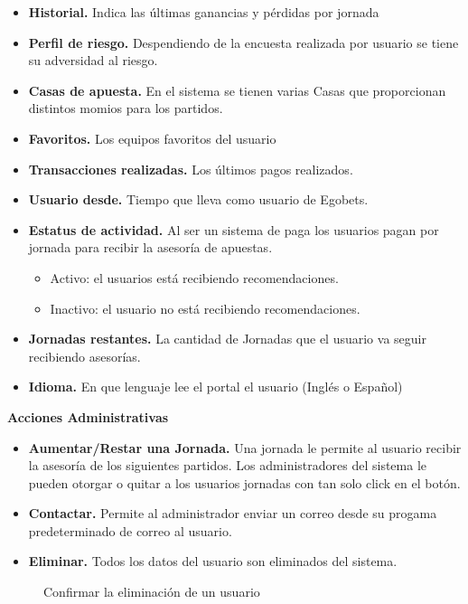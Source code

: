 \begin{itemize}
	\item \textbf{Historial.} Indica las últimas ganancias y pérdidas por jornada
	\item \textbf{Perfil de riesgo.} Despendiendo de la encuesta realizada por usuario se tiene su adversidad al riesgo.
	\item \textbf{Casas de apuesta.} En el sistema se tienen varias Casas que proporcionan distintos momios para los partidos.
	\item \textbf{Favoritos.} Los equipos favoritos del usuario
	\item \textbf{Transacciones realizadas.} Los últimos pagos realizados.
	\item \textbf{Usuario desde.} Tiempo que lleva como usuario de Egobets.
	\item \textbf{Estatus de actividad.} Al ser un sistema de paga los usuarios pagan por jornada para recibir la asesoría de apuestas.
		\begin{itemize}
			\item Activo: el usuarios está recibiendo recomendaciones.
			\item Inactivo: el usuario no está recibiendo recomendaciones.
		\end{itemize}
	\item \textbf{Jornadas restantes.} La cantidad de Jornadas que el usuario va seguir recibiendo asesorías.
	\item \textbf{Idioma.} En que lenguaje lee el portal el usuario (Inglés o Español)
\end{itemize}

\textbf{Acciones Administrativas}
\begin{itemize}
\item \textbf{Aumentar/Restar una Jornada.}
Una jornada le permite al usuario recibir la asesoría de los siguientes partidos.
Los administradores del sistema le pueden otorgar o quitar a los usuarios jornadas con tan solo click en el botón.

\item \textbf{Contactar.}
Permite al administrador enviar un correo desde su progama predeterminado de correo al usuario.

\item \textbf{Eliminar.} Todos los datos del usuario son eliminados del sistema.
\end{itemize}

\begin{figure}[!htb]\centering
   \begin {minipage}{0.5\textwidth}
     \caption[Confirmar la eliminación de un usuario]{Confirmar la eliminación de un usuario\footnotemark}
	 \label{Fig:Eliminar-usuario}
   \end{minipage}
\end{figure}

